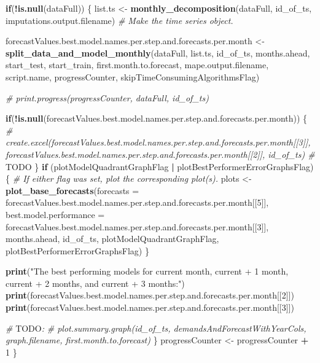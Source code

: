 \documentclass[
]{article}
\newenvironment{Shaded}{\begin{snugshade}}{\end{snugshade}}
\newcommand{\AlertTok}[1]{\textcolor[rgb]{0.94,0.16,0.16}{#1}}
\newcommand{\AttributeTok}[1]{\textcolor[rgb]{0.13,0.29,0.53}{#1}}
\newcommand{\CommentTok}[1]{\textcolor[rgb]{0.56,0.35,0.01}{\textit{#1}}}
\newcommand{\ControlFlowTok}[1]{\textcolor[rgb]{0.13,0.29,0.53}{\textbf{#1}}}
\newcommand{\DecValTok}[1]{\textcolor[rgb]{0.00,0.00,0.81}{#1}}
\newcommand{\FunctionTok}[1]{\textcolor[rgb]{0.13,0.29,0.53}{\textbf{#1}}}
\newcommand{\NormalTok}[1]{#1}
\newcommand{\OtherTok}[1]{\textcolor[rgb]{0.56,0.35,0.01}{#1}}
\newcommand{\SpecialCharTok}[1]{\textcolor[rgb]{0.81,0.36,0.00}{\textbf{#1}}}
\newcommand{\StringTok}[1]{\textcolor[rgb]{0.31,0.60,0.02}{#1}}
\begin{document}
\begin{Shaded}
\begin{Highlighting}[]
  \ControlFlowTok{if}\NormalTok{(}\SpecialCharTok{!}\FunctionTok{is.null}\NormalTok{(dataFull)) \{}
\NormalTok{    list.ts }\OtherTok{\textless{}{-}} \FunctionTok{monthly\_decomposition}\NormalTok{(dataFull, id\_of\_ts, imputations.output.filename) }\CommentTok{\# Make the time series object.}
    
\NormalTok{    forecastValues.best.model.names.per.step.and.forecasts.per.month }\OtherTok{\textless{}{-}} \FunctionTok{split\_data\_and\_model\_monthly}\NormalTok{(dataFull, list.ts, id\_of\_ts, months.ahead, start\_test, start\_train, first.month.to.forecast, mape.output.filename, script.name, progressCounter, skipTimeConsumingAlgorithmsFlag)}

    \CommentTok{\# print.progress(progressCounter, dataFull, id\_of\_ts)}
      
    \ControlFlowTok{if}\NormalTok{(}\SpecialCharTok{!}\FunctionTok{is.null}\NormalTok{(forecastValues.best.model.names.per.step.and.forecasts.per.month)) \{}
      \CommentTok{\# create.excel(forecastValues.best.model.names.per.step.and.forecasts.per.month[[3]], forecastValues.best.model.names.per.step.and.forecasts.per.month[[2]], id\_of\_ts) \# }\AlertTok{TODO}
\NormalTok{    \}              }
    \ControlFlowTok{if}\NormalTok{ (plotModelQuadrantGraphFlag }\SpecialCharTok{|}\NormalTok{ plotBestPerformerErrorGraphsFlag) \{ }\CommentTok{\# If either flag was set, plot the corresponding plot(s).}
\NormalTok{      plots }\OtherTok{\textless{}{-}} \FunctionTok{plot\_base\_forecasts}\NormalTok{(}\AttributeTok{forecasts =}\NormalTok{ forecastValues.best.model.names.per.step.and.forecasts.per.month[[}\DecValTok{5}\NormalTok{]], }\AttributeTok{best.model.performance =}\NormalTok{ forecastValues.best.model.names.per.step.and.forecasts.per.month[[}\DecValTok{3}\NormalTok{]], months.ahead, id\_of\_ts, plotModelQuadrantGraphFlag, plotBestPerformerErrorGraphsFlag)}
\NormalTok{    \}}

    \FunctionTok{print}\NormalTok{(}\StringTok{"The best performing models for current month, current + 1 month, current + 2 months, and current + 3 months:"}\NormalTok{)}
    \FunctionTok{print}\NormalTok{(forecastValues.best.model.names.per.step.and.forecasts.per.month[[}\DecValTok{2}\NormalTok{]])}
    \FunctionTok{print}\NormalTok{(forecastValues.best.model.names.per.step.and.forecasts.per.month[[}\DecValTok{3}\NormalTok{]])}

    \CommentTok{\# }\AlertTok{TODO}\CommentTok{:}
    \CommentTok{\# plot.summary.graph(id\_of\_ts, demandsAndForecastWithYearCols, graph.filename, first.month.to.forecast)}
\NormalTok{  \}   }
\NormalTok{  progressCounter }\OtherTok{\textless{}{-}}\NormalTok{ progressCounter }\SpecialCharTok{+} \DecValTok{1}
\NormalTok{\}}
\end{Highlighting}
\end{Shaded}
\end{document}
